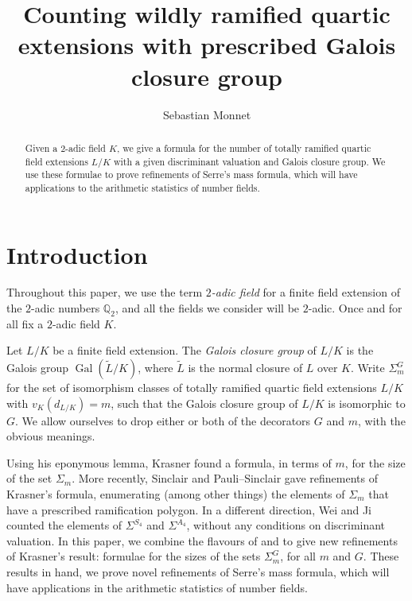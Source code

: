 \documentclass[11pt]{amsart}
\title[Counting wildly ramified quartic extensions]{Counting wildly ramified quartic extensions with prescribed Galois closure group}
\author{Sebastian Monnet}
\date{}
\theoremstyle{theorem}
\theoremstyle{example}
\theoremstyle{definition}
\numberwithin{theorem}{section}
\numberwithin{theorem}{section}
\DeclareMathOperator{\Gal}{Gal}
\newcommand{\Q}{\mathbb{Q}}
\begin{document}
\maketitle

\begin{abstract}
    Given a $2$-adic field $K$, we give a formula for the number of totally ramified quartic field extensions $L/K$ with a given discriminant valuation and Galois closure group. We use these formulae to prove refinements of Serre's mass formula, which will have applications to the arithmetic statistics of number fields.   
\end{abstract}
\tableofcontents
\section{Introduction}
\label{sec-intro}

Throughout this paper, we use the term \emph{$2$-adic field} for a finite field extension of the $2$-adic numbers $\Q_2$, and all the fields we consider will be $2$-adic. Once and for all fix a $2$-adic field $K$. 

Let $L/K$ be a finite field extension. The \emph{Galois closure group} of $L/K$ is the Galois group $\Gal(\widetilde{L}/K)$, where $\widetilde{L}$ is the normal closure of $L$ over $K$. Write 
$
\Sigma_m^G
$
for the set of isomorphism classes of totally ramified quartic field extensions $L/K$ with $v_K(d_{L/K}) = m$, such that the Galois closure group of $L/K$ is isomorphic to $G$. We allow ourselves to drop either or both of the decorators $G$ and $m$, with the obvious meanings. 

Using his eponymous lemma, Krasner \cite[Th\'eor\`eme 1]{krasner} found a formula, in terms of $m$, for the size of the set $\Sigma_m$. More recently, Sinclair \cite{sinclair} and Pauli--Sinclair \cite{pauli-sinclair} gave refinements of Krasner's formula, enumerating (among other things) the elements of $\Sigma_m$ that have a prescribed ramification polygon. In a different direction, Wei and Ji \cite{wei-ji} counted the elements of $\Sigma^{S_4}$ and $\Sigma^{A_4}$, without any conditions on discriminant valuation. In this paper, we combine the flavours of \cite{pauli-sinclair} and \cite{wei-ji} to give new refinements of Krasner's result: formulae for the sizes of the sets $\Sigma_m^G$, for all $m$ and $G$. These results in hand, we prove novel refinements of Serre's mass formula, which will have applications in the arithmetic statistics of number fields.
\end{document}
